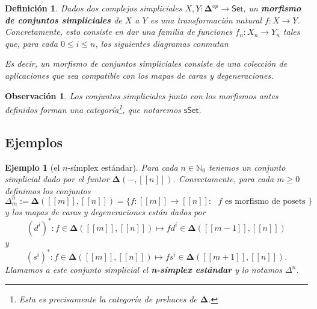 \documentclass[11pt]{report}
\theoremstyle{colored}
\newtheorem{definition}{Definición}[section]
\newtheorem{remark}{Observación}[section]
\newtheorem{example}{Ejemplo}[section]
\newcommand{\N}{\mathbb{N}}
\newcommand{\nat}[1]{[\![#1]\!]}
\newcommand{\ord}[1]{\nat{#1}}
\newcommand{\cat}[1]{\mathsf{#1}}
\renewcommand{\ss}[1]{\Delta^{#1}}
\newcommand{\ordcat}{\boldsymbol{\Delta}}
\begin{document}
\begin{definition} Dados dos complejos simpliciales $X,Y : \ordcat^{op} \to \cat{Set}$, un \textbf{morfismo de conjuntos simpliciales} de $X$ a $Y$ es una transformación natural $f : X \to Y$. Concretamente, esto consiste en dar una familia de funciones $f_n : X_n \to Y_n$ tales que, para cada $0 \leq i \leq n$, los siguientes diagramas conmutan
\begin{center}
\end{center}

Es decir, un morfismo de conjuntos simpliciales consiste de una colección de aplicaciones que sea compatible con los mapas de caras y degeneraciones.
\end{definition}

\begin{remark} Los conjuntos simpliciales junto con los morfismos antes definidos forman una categoría\footnote{Esta es precisamente la categoría de prehaces de $\ordcat$.}, que notaremos $\cat{sSet}$.
\end{remark}

\subsection{Ejemplos}

\begin{example}[el $n$-símplex estándar] Para cada $n \in \N_0$ tenemos un conjunto simplicial dado por el funtor $\ordcat(-,\ord{n})$. Conrectamente, para cada $m \geq 0$ definimos los conjuntos
\[
\ss{n}_m := \ordcat(\ord{m},\ord{n}) = \{f : \ord{m} \to \ord{n} : \text{ $f$ es morfismo de posets } \}
\]
y los mapas de caras y degeneraciones están dados por
\[
(d^i)^* : f \in \ordcat(\ord{m},\ord{n}) \mapsto fd^i \in \ordcat(\ord{m-1},\ord{n})
\]
y
\[
(s^i)^* : f \in \ordcat(\ord{m},\ord{n}) \mapsto fs^i \in \ordcat(\ord{m+1},\ord{n}).
\]
Llamamos a este conjunto simplicial el \textbf{n-símplex estándar} y lo notamos $\ss{n}$.
\end{example}
\end{document}
